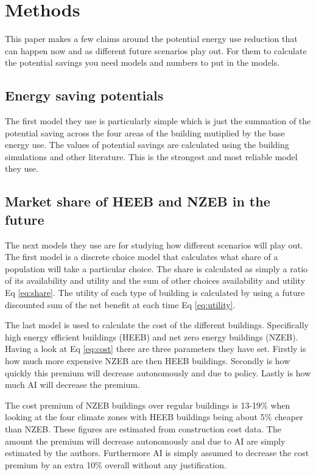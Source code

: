 \documentclass[conference,a4paper]{IEEEtran}
\begin{document}
\section*{Methods}

This paper makes a few claims around the potential energy use reduction that can happen now and as different future scenarios play out. For them to calculate the potential savings you need models and numbers to put in the models.

\subsection*{Energy saving potentials}

The first model they use is particularly simple which is just the summation of the potential saving across the four areas of the building mutiplied by the base energy use. The values of potential savings are calculated using the building simulations and other literature. This is the strongest and most reliable model they use.

\subsection*{Market share of HEEB and NZEB in the future}

The next models they use are for studying how different scenarios will play out. The first model is a discrete choice model that calculates what share of a population will take a particular choice. The share is calculated as simply a ratio of its availability and utility and the sum of other choices availability and utility Eq \ref{eq:share}. The utility of each type of building is calculated by using a future discounted sum of the net benefit at each time Eq \ref{eq:utility}.

The last model is used to calculate the cost of the different buildings. Specifically high energy efficient buildings (HEEB) and net zero energy buildings (NZEB). Having a look at Eq \ref{eq:cost} there are three parameters they have set. Firstly is how much more expensive NZEB are then HEEB buildings. Secondly is how quickly this premium will decrease autonomously and due to policy. Lastly is how much AI will decrease the premium.

The cost premium of NZEB buildings over regular buildings is 13-19\% when looking at the four climate zones with HEEB buildings being about 5\% cheaper than NZEB. These figures are estimated from construction cost data. The amount the premium will decrease autonomously and due to AI are simply estimated by the authors. Furthermore AI is simply assumed to decrease the cost premium by an extra 10\% overall without any justification.
\end{document}
